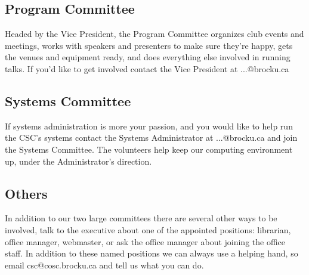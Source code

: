 \documentclass[10pt,letterpaper]{article}
\begin{document}
\begin{multicols}{3}
\subsection*{Program Committee}

Headed by the Vice President, the Program Committee organizes club events and
meetings, works with speakers and presenters to make sure they're happy, gets
the venues and equipment ready, and does everything else involved in running talks.
If you'd like to get involved contact the Vice President at 
...@brocku.ca

\subsection*{Systems Committee}

If systems administration is more your passion, and you would like to help run
the CSC's systems contact the Systems Administrator at
...@brocku.ca and join the Systems Committee. The volunteers
help keep our computing environment up, under the Administrator's
direction.

\subsection*{Others}

In addition to our two large committees there are several other ways to be
involved, talk to the executive about one of the appointed positions:
librarian, office manager, webmaster, or ask the office manager about joining
the office staff. In addition to these named positions we can always use a
helping hand, so email csc@cosc.brocku.ca and tell us what you can do.

\end{multicols}

\pagebreak
\end{document}
